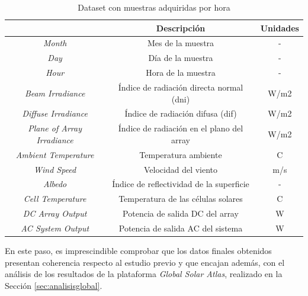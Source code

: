 \vspace{3mm}

\begin{table}[h!]
    \centering
    \begin{tabular}{|c|c|c|}
    \hline
    \rowcolor[HTML]{AAAAAA} 
    \multicolumn{1}{|c|}{\cellcolor[HTML]{AAAAAA}Campo} & \multicolumn{1}{c|}{\cellcolor[HTML]{AAAAAA}Descripción} & Unidades \\ \hline
    \textit{Month} & Mes de la muestra & - \\ \hline
    \textit{Day} & Día de la muestra & - \\ \hline
    \textit{Hour} & Hora de la muestra & - \\ \hline
    \textit{Beam Irradiance} & Índice de radiación directa normal (\gls{dni}) & W/m2 \\ \hline %
    \textit{Diffuse Irradiance} & Índice de radiación difusa (\gls{dif}) & W/m2 \\ \hline
    \textit{Plane of Array Irradiance} & Índice de radiación en el plano del array & W/m2 \\ \hline %
    \textit{Ambient Temperature} & Temperatura ambiente & C \\ \hline
    \textit{Wind Speed} & Velocidad del viento & m/s \\ \hline
    \textit{Albedo} & Índice de reflectividad de la superficie & - \\ \hline
    \textit{Cell Temperature} & Temperatura de las células solares & C \\ \hline
    \textit{DC Array Output} & Potencia de salida DC del array & W \\ \hline
    \textit{AC System Output} & Potencia de salida AC del sistema & W \\ \hline
    \end{tabular}
    \caption{Dataset con muestras adquiridas por hora \cite{pvwatts}}
    \label{tab:pvwattsdataset}
\end{table}

\vspace{3mm}

En este paso, es imprescindible comprobar que los datos finales obtenidos presentan coherencia respecto al estudio previo y que encajan además, con el análisis de los resultados de la plataforma \textit{Global Solar Atlas}, realizado en la Sección \ref{sec:analisisglobal}. 

\vspace{3mm}

